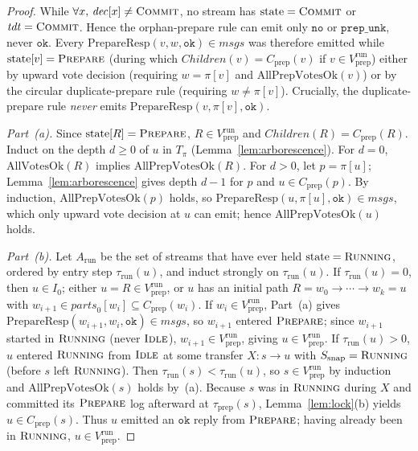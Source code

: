 \documentclass[sigconf,nonacm]{acmart}
\newcommand{\stIdle}{\textsc{Idle}}
\newcommand{\stRun}{\textsc{Running}}
\newcommand{\stPrep}{\textsc{Prepare}}
\newcommand{\stCom}{\textsc{Commit}}
\newcommand{\Children}{\mathit{Children}}
\newcommand{\parts}{\mathit{parts}}
\newcommand{\tdt}{\mathit{tdt}}
\newcommand{\dec}{\mathit{dec}}
\begin{document}
\begin{proof}
While \(\forall x,\, \dec[x] \neq \stCom\), no stream has \(\mathrm{state} =
\stCom\) or \(\tdt = \stCom\). Hence the orphan-prepare rule can emit only
\(\mathtt{no}\) or \(\mathtt{prep\_unk}\), never \(\mathtt{ok}\). Every
\(\mathrm{PrepareResp}(v, w, \mathtt{ok}) \in \mathit{msgs}\) was therefore
emitted while \(\mathrm{state}[v] = \stPrep\) (during which \(\Children(v) =
C_{\mathrm{prep}}(v)\) if \(v \in V_{\mathrm{prep}}^{\mathrm{run}}\)) either
by upward vote decision (requiring \(w = \pi[v]\) and
\(\mathrm{AllPrepVotesOk}(v)\)) or by the circular duplicate-prepare rule
(requiring \(w \neq \pi[v]\)). Crucially, the duplicate-prepare rule
\emph{never} emits \(\mathrm{PrepareResp}(v, \pi[v], \mathtt{ok})\).

\emph{Part~(a).} Since \(\mathrm{state}[R] = \stPrep\), \(R \in
V_{\mathrm{prep}}^{\mathrm{run}}\) and \(\Children(R) = C_{\mathrm{prep}}(R)\).
Induct on the depth \(d \ge 0\) of \(u\) in \(T_\pi\)
(Lemma~\ref{lem:arborescence}). For \(d = 0\), \(\mathrm{AllVotesOk}(R)\)
implies \(\mathrm{AllPrepVotesOk}(R)\). For \(d > 0\), let \(p = \pi[u]\);
Lemma~\ref{lem:arborescence} gives depth \(d - 1\) for \(p\) and \(u \in
C_{\mathrm{prep}}(p)\). By induction, \(\mathrm{AllPrepVotesOk}(p)\) holds,
so \(\mathrm{PrepareResp}(u, \pi[u], \mathtt{ok}) \in \mathit{msgs}\), which
only upward vote decision at \(u\) can emit; hence
\(\mathrm{AllPrepVotesOk}(u)\) holds.

\emph{Part~(b).} Let \(A_{\mathrm{run}}\) be the set of streams that have
ever held \(\mathrm{state} = \stRun\), ordered by entry step
\(\tau_{\mathrm{run}}(u)\), and induct strongly on \(\tau_{\mathrm{run}}(u)\).
If \(\tau_{\mathrm{run}}(u) = 0\), then \(u \in I_0\); either \(u = R \in
V_{\mathrm{prep}}^{\mathrm{run}}\), or \(u\) has an initial path
\(R = w_0 \to \cdots \to w_k = u\) with \(w_{i+1} \in \parts_0[w_i] \subseteq
C_{\mathrm{prep}}(w_i)\). If \(w_i \in V_{\mathrm{prep}}^{\mathrm{run}}\),
Part~(a) gives \(\mathrm{PrepareResp}(w_{i+1}, w_i, \mathtt{ok}) \in
\mathit{msgs}\), so \(w_{i+1}\) entered \(\stPrep\); since \(w_{i+1}\)
started in \(\stRun\) (never \(\stIdle\)), \(w_{i+1} \in
V_{\mathrm{prep}}^{\mathrm{run}}\), giving \(u \in
V_{\mathrm{prep}}^{\mathrm{run}}\).
If \(\tau_{\mathrm{run}}(u) > 0\), \(u\) entered \(\stRun\) from \(\stIdle\)
at some transfer \(X : s \to u\) with \(S_{\mathrm{snap}} = \stRun\) (before
\(s\) left \(\stRun\)). Then \(\tau_{\mathrm{run}}(s) <
\tau_{\mathrm{run}}(u)\), so \(s \in V_{\mathrm{prep}}^{\mathrm{run}}\) by
induction and \(\mathrm{AllPrepVotesOk}(s)\) holds by~(a). Because \(s\) was
in \(\stRun\) during \(X\) and committed its \(\stPrep\) log afterward at
\(\tau_{\mathrm{prep}}(s)\), Lemma~\ref{lem:lock}(b) yields \(u \in
C_{\mathrm{prep}}(s)\). Thus \(u\) emitted an \(\mathtt{ok}\) reply from
\(\stPrep\); having already been in \(\stRun\), \(u \in
V_{\mathrm{prep}}^{\mathrm{run}}\).


\end{proof}
\end{document}
